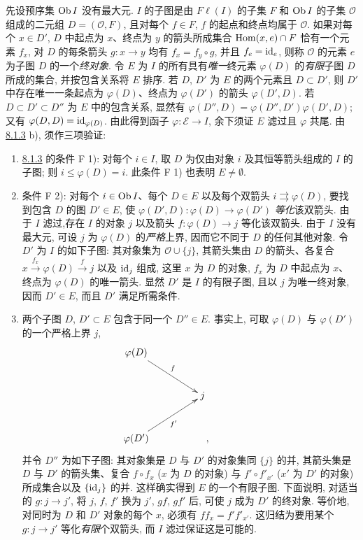 先设预序集 $\operatorname{Ob} I$ 没有最大元.
$I$ 的子图是由 $F\ell(I)$ 的子集 $F$ 和 $\operatorname{Ob} I$ 的子集 $\mathcal{O}$ 组成的二元组
$D=(\mathcal{O},F)$, 且对每个 $f\in F$, $f$ 的起点和终点均属于 $\mathcal{O}$.
如果对每个 $x\in D'$, $D$ 中起点为 $x$、终点为 $y$ 的箭头所成集合
$\operatorname{Hom}(x,e)\cap F$ 恰有一个元素 $f_x$, 对 $D$ 的每条箭头
$g:x\rightarrow y$ 均有 $f_x=f_y\circ g$, 并且 $f_e=\operatorname{id}_e$,
则称 $\mathcal{O}$ 的元素 $e$ 为子图 $D$ 的一个\emph{终对象}.
令 $E$ 为 $I$ 的所有具有\emph{唯一}终元素 $\varphi(D)$ 的\emph{有限}子图 $D$ 所成的集合,
并按包含关系将 $E$ 排序. 若 $D$, $D'$ 为 $E$ 的两个元素且 $D\subset D'$,
则 $D'$ 中存在唯一一条起点为 $\varphi(D)$、终点为 $\varphi(D')$ 的箭头
$\varphi(D',D)$. 若 $D\subset D'\subset D''$ 为 $E$ 中的包含关系,
显然有 $\varphi(D'',D)=\varphi(D'',D')\varphi(D',D)$; 又有
$\varphi(D,D)=\operatorname{id}_{\varphi(D)}$. 由此得到函子 $\varphi:ℰ\rightarrow I$,
余下须证 $E$ 滤过且 $\varphi$ 共尾. 由 \hyperref[I.prop8.1.3]{8.1.3} b),
须作三项验证:
\begin{enumerate}
\renewcommand{\labelenumi}{\theenumi)}
\item \hyperref[I.prop8.1.3]{8.1.3} 的条件 F 1): 对每个 $i\in I$,
取 $D$ 为仅由对象 $i$ 及其恒等箭头组成的 $I$ 的子图; 则 $i\leq \varphi(D)=i$.
此条件 F 1) 也表明 $E\neq ∅$.

\item 条件 F 2): 对每个 $i\in \operatorname{Ob} I$、每个 $D\in E$ 以及每个双箭头
$i\rightrightarrows \varphi(D)$, 要找到包含 $D$ 的图 $D'\in E$,
使 $\varphi(D',D):\varphi(D)\rightarrow \varphi(D')$ \emph{等化}该双箭头.
由于 $I$ 滤过,\pageoriginale{}存在 $I$ 的对象 $j$ 以及箭头
$f:\varphi(D)\rightarrow j$ 等化该双箭头. 由于 $I$ 没有最大元,
可设 $j$ 为 $\varphi(D)$ 的\emph{严格}上界, 因而它不同于 $D$ 的任何其他对象.
令 $D'$ 为 $I$ 的如下子图: 其对象集为 $\mathcal{O}\cup\{j\}$,
其箭头集由 $D$ 的箭头、各复合
$x\xrightarrow{f_x}\varphi(D)\xrightarrow{f}j$
以及 $\operatorname{id}_j$ 组成, 这里 $x$ 为 $D$ 的对象, $f_x$ 为 $D$ 中起点为 $x$、终点为
$\varphi(D)$ 的唯一箭头. 显然 $D'$ 是 $I$ 的有限子图, 且以 $j$ 为唯一终对象,
因而 $D'\in E$, 而且 $D'$ 满足所需条件.

\renewcommand{\labelenumi}{$3^\circ$}
\item 两个子图 $D$, $D'\subset E$ 包含于同一个 $D''\in E$.
事实上, 可取 $\varphi(D)$ 与 $\varphi(D')$ 的一个严格上界 $j$,
\[
\xymatrix@C=1.5cm@R=1cm{
\varphi(D)\ar[rd]^f && \\
           &j &\\
\varphi(D')\ar[ru]_{f'}&\quad , }
\]
并令 $D''$ 为如下子图: 其对象集是 $D$ 与 $D'$ 的对象集同 $\{j\}$ 的并,
其箭头集是 $D$ 与 $D'$ 的箭头集、复合 $f\circ f_x$ ($x$ 为 $D$ 的对象)
与 $f'\circ f'_{x'}$ ($x'$ 为 $D'$ 的对象) 所成集合以及 $\{\operatorname{id}_j\}$ 的并.
这样确实得到 $E$ 的一个有限子图. 下面说明, 对适当的 $g:j\rightarrow j'$,
将 $j$, $f$, $f'$ 换为 $j'$, $gf$, $gf'$ 后, 可使 $j$ 成为 $D'$ 的终对象.
等价地, 对同时为 $D$ 和 $D'$ 对象的每个 $x$, 必须有 $ff_x=f'f'_{x'}$.
这归结为要用某个 $g:j\rightarrow j'$ 等化\emph{有限}个双箭头,\pageoriginale
而 $I$ 滤过保证这是可能的.
\end{enumerate}

